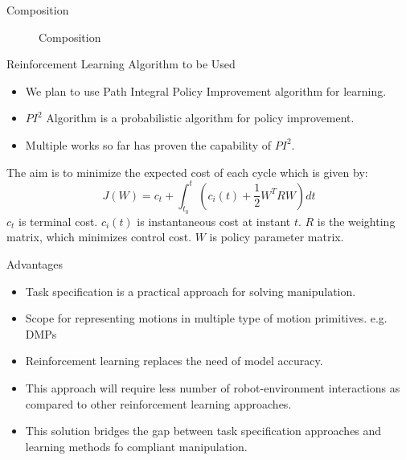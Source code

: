 \documentclass[10pt]{beamer}
\begin{document}
\begin{frame}{Composition}
	\begin{figure}[!h]
		\caption{\label{fig:composition} Composition}
	\end{figure}
\end{frame}

\begin{frame}{Reinforcement Learning Algorithm to be Used}
	\begin{itemize}
		\item We plan to use Path Integral Policy Improvement algorithm for learning\cite{kalakrishnan2011learning}.
		\item $PI^{2}$ Algorithm is a probabilistic algorithm for policy improvement. 
		\item Multiple works so far has proven the capability of $PI^{2}$. 
	\end{itemize}
	The aim is to minimize the expected cost of each cycle which is given by:
	$$J(W) = c_{t} + \int_{t_{0}}^{t} (c_{i}(t)+\frac{1}{2} {W}^{T}RW)dt$$
	$c_{t}$ is terminal cost.
	$c_{i}(t)$ is instantaneous cost at instant $t$.
	$R$ is the weighting matrix, which minimizes control cost. $W$ is policy parameter matrix.
\end{frame}

\begin{frame}{Advantages}
	\begin{itemize}
		\item Task specification is a practical approach for solving manipulation.
		\item Scope for representing motions in multiple type of motion primitives. e.g. DMPs
		\item Reinforcement learning replaces the need of model accuracy.
		\item This approach will require less number of robot-environment interactions as compared to other reinforcement learning approaches.
		\item This solution bridges the gap between task specification approaches and learning methods fo compliant manipulation. 
	\end{itemize}
	
	
	
\end{frame}
\end{document}
